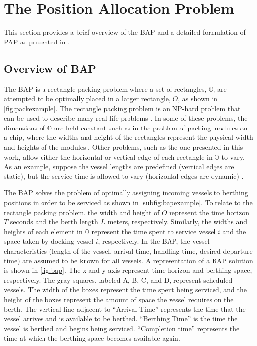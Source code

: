 \documentclass[utf8]{FrontiersinHarvard}
\let\cite\citep                                       %
\newcommand{\EDIT}[1]{{\color{blue}#1}}                                         %
\begin{document}
\section{The Position Allocation Problem}
\label{sec:the-position-allocation-problem}
This section provides a brief overview of the BAP and a detailed formulation of PAP as presented in
\cite{qarebagh-2019-optim-sched}.

\subsection{Overview of BAP}
\label{sec:overview-of-bap}
The BAP is a rectangle packing problem where a set of rectangles, \(\mathbb{O}\), are attempted to be optimally placed in
a larger rectangle, \(O\), as shown in \autoref{fig:packexample}. The rectangle packing problem is an NP-hard problem that
can be used to describe many real-life problems \cite{bruin-2013-rectan-packin,murata-1995-rectan}. In some of these
problems, the dimensions of \(\mathbb{O}\) are held constant such as in the problem of packing modules on a chip, where
the widths and height of the rectangles represent the physical width and heights of the modules
\cite{murata-1995-rectan}. Other problems, such as the one presented in this work, allow either the horizontal or
vertical edge of each rectangle in \(\mathbb{O}\) to vary. As an example, suppose the vessel lengths are predefined
(vertical edges are static), but the service time is allowed to vary (horizontal edges are dynamic)
\cite{buhrkal-2011-model-discr}.

The BAP solves the problem of optimally assigning incoming vessels to \EDIT{berthing} positions \EDIT{in order} to be
serviced as shown in \autoref{subfig:bapexample}. To relate to the rectangle packing problem, the width and height of
\(O\) represent the time horizon \(T\) seconds and the berth length \(L\) meters, respectively. Similarly, the widths and
heights of each element in \(\mathbb{O}\) represent the time spent to service vessel \(i\) and the space taken by docking
vessel \(i\), respectively. In the BAP, the vessel characteristics (length of the vessel, arrival time, handling time,
desired departure time) are assumed to be known for all vessels. A representation of a BAP solution is shown in
\autoref{fig:bap}. The x and y-axis represent time horizon and berthing space, respectively. The gray squares, labeled
A, B, C, and D, represent scheduled vessels. The width of the boxes represent the time spent being serviced, and the
height \EDIT{of the boxes} represent the amount of space the vessel requires on the berth. The vertical line adjacent to
``Arrival Time'' represents the time that the vessel arrives and is available to be berthed. ``Berthing Time'' is the
time the vessel is berthed and begins being serviced. ``Completion time'' represents the time at which the berthing
space becomes available again.
\end{document}
